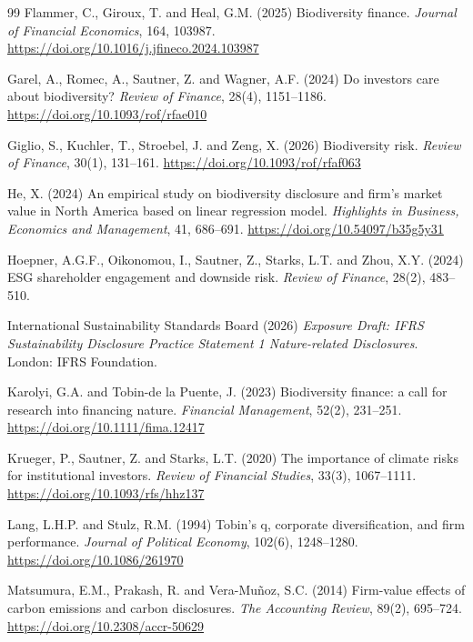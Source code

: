 \documentclass[12pt,a4paper]{article}
\begin{document}
\begin{thebibliography}{99}
 Flammer, C., Giroux, T. and Heal, G.M. (2025) Biodiversity finance. \emph{Journal of Financial Economics}, 164, 103987. \url{https://doi.org/10.1016/j.jfineco.2024.103987}

 Garel, A., Romec, A., Sautner, Z. and Wagner, A.F. (2024) Do investors care about biodiversity? \emph{Review of Finance}, 28(4), 1151--1186. \url{https://doi.org/10.1093/rof/rfae010}

 Giglio, S., Kuchler, T., Stroebel, J. and Zeng, X. (2026) Biodiversity risk. \emph{Review of Finance}, 30(1), 131--161. \url{https://doi.org/10.1093/rof/rfaf063}

 He, X. (2024) An empirical study on biodiversity disclosure and firm's market value in North America based on linear regression model. \emph{Highlights in Business, Economics and Management}, 41, 686--691. \url{https://doi.org/10.54097/b35g5y31}

 Hoepner, A.G.F., Oikonomou, I., Sautner, Z., Starks, L.T. and Zhou, X.Y. (2024) ESG shareholder engagement and downside risk. \emph{Review of Finance}, 28(2), 483--510.

 International Sustainability Standards Board (2026) \emph{Exposure Draft: IFRS Sustainability Disclosure Practice Statement 1 Nature-related Disclosures}. London: IFRS Foundation.

 Karolyi, G.A. and Tobin-de la Puente, J. (2023) Biodiversity finance: a call for research into financing nature. \emph{Financial Management}, 52(2), 231--251. \url{https://doi.org/10.1111/fima.12417}

 Krueger, P., Sautner, Z. and Starks, L.T. (2020) The importance of climate risks for institutional investors. \emph{Review of Financial Studies}, 33(3), 1067--1111. \url{https://doi.org/10.1093/rfs/hhz137}

 Lang, L.H.P. and Stulz, R.M. (1994) Tobin's q, corporate diversification, and firm performance. \emph{Journal of Political Economy}, 102(6), 1248--1280. \url{https://doi.org/10.1086/261970}

 Matsumura, E.M., Prakash, R. and Vera-Mu\~noz, S.C. (2014) Firm-value effects of carbon emissions and carbon disclosures. \emph{The Accounting Review}, 89(2), 695--724. \url{https://doi.org/10.2308/accr-50629}


\end{thebibliography}
\end{document}
